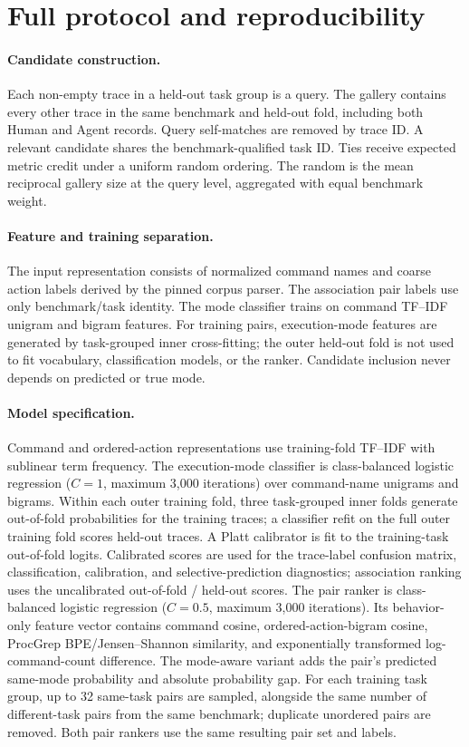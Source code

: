 \section{Full protocol and reproducibility}

\paragraph{Candidate construction.} Each non-empty trace in a held-out task group is a query. The gallery contains every other trace in the same benchmark and held-out fold, including both Human and Agent records. Query self-matches are removed by trace ID. A relevant candidate shares the benchmark-qualified task ID. Ties receive expected metric credit under a uniform random ordering. The random \Hit{} is the mean reciprocal gallery size at the query level, aggregated with equal benchmark weight.

\paragraph{Feature and training separation.} The input representation consists of normalized command names and coarse action labels derived by the pinned corpus parser. The association pair labels use only benchmark/task identity. The mode classifier trains on command TF--IDF unigram and bigram features. For training pairs, execution-mode features are generated by task-grouped inner cross-fitting; the outer held-out fold is not used to fit vocabulary, classification models, or the ranker. Candidate inclusion never depends on predicted or true mode.

\paragraph{Model specification.} Command and ordered-action representations use training-fold TF--IDF with sublinear term frequency. The execution-mode classifier is class-balanced logistic regression ($C=1$, maximum 3,000 iterations) over command-name unigrams and bigrams. Within each outer training fold, three task-grouped inner folds generate out-of-fold probabilities for the training traces; a classifier refit on the full outer training fold scores held-out traces. A Platt calibrator is fit to the training-task out-of-fold logits. Calibrated scores are used for the trace-label confusion matrix, classification, calibration, and selective-prediction diagnostics; association ranking uses the uncalibrated out-of-fold / held-out scores. The pair ranker is class-balanced logistic regression ($C=0.5$, maximum 3,000 iterations). Its behavior-only feature vector contains command cosine, ordered-action-bigram cosine, ProcGrep BPE/Jensen--Shannon similarity, and exponentially transformed log-command-count difference. The mode-aware variant adds the pair's predicted same-mode probability and absolute probability gap. For each training task group, up to 32 same-task pairs are sampled, alongside the same number of different-task pairs from the same benchmark; duplicate unordered pairs are removed. Both pair rankers use the same resulting pair set and labels.

